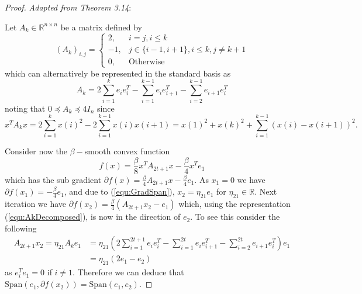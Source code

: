 \begin{proof}
\textit{Adapted from \cite{bubeck} Theorem 3.14}:

Let $A_k \in \mathbb{R}^{n \times n}$ be a matrix defined by
\begin{equation*}
(A_k)_{i,j} = \begin{cases}
2, & i = j,i \leq k \\
-1, & j \in \{i-1,i+1\}, i \leq k, j \not= k+1 \\
0, &\text{Otherwise}
\end{cases}
\end{equation*}
which can alternatively be represented in the standard basis as
\begin{equation}
A_k = 2 \sum_{i=1}^k e_i e_i^T - \sum_{i=1}^{k-1} e_{i}e_{i+1}^T - \sum_{i=2}^{k-1}e_{i+1} e_i^T
\label{equ:AkDecomposed}
\end{equation}
noting that $0 \preccurlyeq  A_k  \preccurlyeq 4 I_n$ since
\begin{equation*}
x^TA_kx = 2 \sum_{i=1}^k x(i)^2 -2\sum_{i=1}^{k-1}x(i)x(i+1) =
 x(1)^2 + x(k)^2 + \sum_{i=1}^{k-1} (x(i) - x(i+1))^2.
\end{equation*}

Consider now the $\beta-$smooth convex function
\begin{equation*}
f(x) = \frac{\beta}{8}x^T A_{2t +1} x - \frac{\beta}{4}x^T e_1
\end{equation*}
which has the sub gradient $\partial f(x) = \frac{\beta}{4} A_{2t +1} x - \frac{\beta}{4}e_1$. As $x_1=0$ we have $\partial f(x_1) = - \frac{\beta}{4}e_1$, and due to (\ref{equ:GradSpan}), $x_2 = \eta_{21}e_1$ for $\eta_{21} \in \mathbb{R}$. Next iteration we have $\partial f(x_2) = \frac{\beta}{4} \left( A_{2t+1} x_2 - e_1\right)$ which, using the representation (\ref{equ:AkDecomposed}), is now in the direction of $e_2$. To see this consider the following
\begin{align*}
A_{2t+1}x_2 = \eta_{21} A_k e_1 & = \eta_{21} \left(
2 \sum_{i=1}^{2t+1} e_i e_i^T - \sum_{i=1}^{2t} e_{i}e_{i+1}^T - \sum_{i=2}^{2t}e_{i+1} e_i^T
\right)e_1\\
& = \eta_{21} \left(
2 e_1 - e_{2}
\right)
\end{align*}
as $e_i^Te_1 = 0$ if $i \not = 1$. Therefore we can deduce that $\text{Span}(e_1,\partial f(x_2)) = \text{Span}(e_1,e_2)$.


\end{proof}
